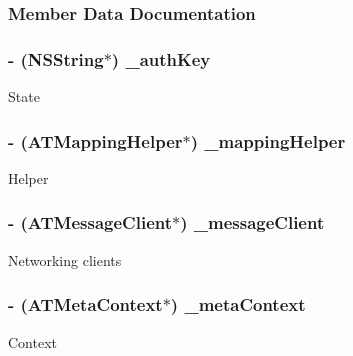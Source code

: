 \subsubsection{Member Data Documentation}
\hypertarget{interface_a_t_synchronizer_aff441de7abd4bb9fb6fb62ebfb36c072}{
\subsubsection[{\_\-authKey}]{\setlength{\rightskip}{0pt plus 5cm}-\/ ({\bf NSString}$\ast$) {\bf \_\-authKey}}}
\label{interface_a_t_synchronizer_aff441de7abd4bb9fb6fb62ebfb36c072}
State \hypertarget{interface_a_t_synchronizer_a31d09b73a13ca9815cd0f62d60dbc373}{
\subsubsection[{\_\-mappingHelper}]{\setlength{\rightskip}{0pt plus 5cm}-\/ ({\bf ATMappingHelper}$\ast$) {\bf \_\-mappingHelper}}}
\label{interface_a_t_synchronizer_a31d09b73a13ca9815cd0f62d60dbc373}
Helper \hypertarget{interface_a_t_synchronizer_a7540768d28730fa0da9a29c8bd3db701}{
\subsubsection[{\_\-messageClient}]{\setlength{\rightskip}{0pt plus 5cm}-\/ ({\bf ATMessageClient}$\ast$) {\bf \_\-messageClient}}}
\label{interface_a_t_synchronizer_a7540768d28730fa0da9a29c8bd3db701}
Networking clients \hypertarget{interface_a_t_synchronizer_a14e16b95fa385616596db1b540fb8280}{
\subsubsection[{\_\-metaContext}]{\setlength{\rightskip}{0pt plus 5cm}-\/ ({\bf ATMetaContext}$\ast$) {\bf \_\-metaContext}}}
\label{interface_a_t_synchronizer_a14e16b95fa385616596db1b540fb8280}
Context 

